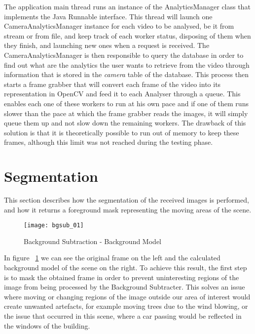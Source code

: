 The application main thread runs an instance of the AnalyticsManager class that implements the Java Runnable interface. This thread will launch one CameraAnalyticsManager instance for each video to be analysed, be it from stream or from file, and keep track of each worker status, disposing of them when they finish, and launching new ones when a request is received. The CameraAnalyticsManager is then responsible to query the database in order to find out what are the analytics the user wants to retrieve from the video through information that is stored in the \textit{camera} table of the database. This process then starts a frame grabber that will convert each frame of the video into its representation in OpenCV and feed it to each Analyser through a queue. This enables each one of these workers to run at his own pace and if one of them runs slower than the pace at which the frame grabber reads the images, it will simply queue them up and not slow down the remaining workers. The drawback of this solution is that it is theoretically possible to run out of memory to keep these frames, although this limit was not reached during the testing phase.

\section{Segmentation}

This section describes how the segmentation of the received images is performed, and how it returns a foreground mask representing the moving areas of the scene. 

\begin{figure}[h]
  \begin{center}
    \leavevmode
    \texttt{[image: bgsub\_01]}
    \caption{Background Subtraction - Background Model}
    \label{fig:bgsub_01}
  \end{center}
\end{figure}

In figure ~\ref{fig:bgsub_01} we can see the original frame on the left and the calculated background model of the scene on the right. To achieve this result, the first step is to mask the obtained frame  in order to prevent uninteresting regions of the image from being processed by the Background Subtracter. This solves an issue where moving or changing regions of the image outside our area of interest would create unwanted artefacts, for example moving trees due to the wind blowing, or the issue that occurred in this scene, where a car passing would be reflected in the windows of the building.

